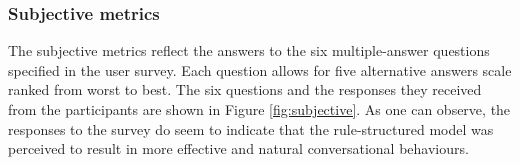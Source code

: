 \subsubsection*{Subjective metrics}

The subjective metrics reflect the answers to the six multiple-answer questions specified in the user survey. Each question allows for five alternative answers scale ranked from worst to best.  The six questions and the responses they received from the participants are shown in Figure \ref{fig:subjective}. As one can observe, the responses to the survey do seem to indicate that the rule-structured model was perceived to result in more effective and natural conversational behaviours. 





